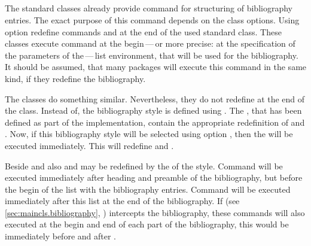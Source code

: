 \begin{Declaration}
  \\
  \\
  \\
  \\
\end{Declaration}
%
%
%
%
%
The standard classes already provide command
 for structuring of bibliography entries. The exact purpose of
this command depends on the class options. Using option
 redefine commands
 and  at the end of the used standard
class. These classes execute command  at the
begin\,---\,or more precise: at the specification of the parameters of
the\,---\,list environment, that will be used for the bibliography. It should
be assumed, that many packages will execute this command in the same kind, if
they redefine the bibliography.

The \KOMAScript{} classes do something similar. Nevertheless, they do not
redefine  at the end of the class. Instead of, the
bibliography style  is defined using
. The , that has been defined as part
of the implementation, contain the appropriate redefinition of
 and . Now, if this bibliography style
will be selected using option %
%
, then the
 will be executed immediately. This will redefine
 and .

Beside  and  also 
and  may be redefined by the  of the
style. Command  will be executed immediately after
heading and preamble of the bibliography, but before the begin of the list
with the bibliography entries. Command  will be executed
immediately after this list at the end of the bibliography. If
 (see \autoref{sec:maincls.bibliography},
) intercepts the bibliography,
these commands will also executed at the begin and end of each part of the
bibliography, this would be immediately before and after
.


